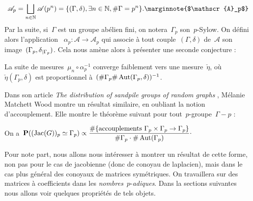 	\[
		\mathscr{A}_p = \bigsqcup_{n\in\mathbb{N}} \mathscr{A}(p^n)
			= \{(\Gamma,\delta), \exists n\in\mathbb{N},\#\Gamma = p^n\}.
			\text{\marginnote{$\mathscr{A}_p$}}
	\]
	Par la suite, si~$\Gamma$ est un groupe abélien fini, on notera~$\Gamma_p$ son~$p$-Sylow. On défini alors l'application ~$\alpha_p : \mathscr{A} \rightarrow\mathscr{A}_p$ qui associe à tout couple~$(\Gamma,\delta)$ de~$\mathscr{A}$ son image~$(\Gamma_p,\delta{}_{|\Gamma_p})$. Cela nous amène alors à présenter une seconde conjecture :
	\begin{conj}
		La suite de mesures~$\mu_n\circ\alpha_p^{-1}$ converge faiblement vers une mesure~$\check{\eta}$, où~$\check{\eta}(\Gamma_p,\delta)$ est proportionnel à~$(\#\Gamma_p\#\operatorname{Aut}(\Gamma_p,\delta))^{-1}$.
	\end{conj}
	Dans son article \emph{The distribution of sandpile groups of random graphs} \cite{main},  Mélanie Matchett Wood montre un résultat similaire, en oubliant la notion d'accouplement. Elle montre le théorème suivant pour tout~$p$-groupe~$\Gamma-p$ :
	\begin{thm}
		On a~$\displaystyle \bm{\mathrm{P}}((\operatorname{Jac}(G))_p\simeq \Gamma_p) \propto \frac{\#\{\text{accouplements }\Gamma_p\times \Gamma_p\rightarrow \Gamma_p\}}{\#\Gamma_p \cdot \#\operatorname{Aut}(\Gamma_p)} \cdot$
	\end{thm}
	Pour note part, nous allons nous intéresser à montrer un résultat de cette forme, non pas pour le cas de jacobienne (donc de conoyau de laplacien), mais dans le cas plus général des conoyaux de matrices symétriques. On travaillera sur des matrices à coefficients dans les \emph{nombres}~$p$-\emph{adiques}. Dans la sections suivantes nous allons voir quelques propriétés de tels objets.
	